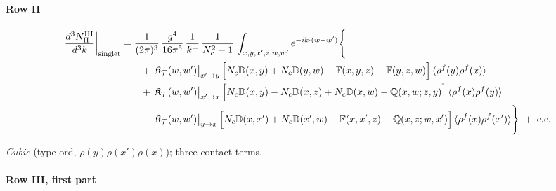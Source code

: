 \documentclass[10pt]{article}
\def\mf#1{\mathbb{#1}}
\begin{document}
\paragraph*{Row II}

\begin{align}
\frac{d^{3}N^{\rm III}_{\rm II}}{d^{3}k}\bigg|_{\rm singlet}&=\frac{1}{(2\pi)^{3}}\,\frac{g^{4}}{16\pi^{5}}\,\frac{1}{k^{+}}\,\frac{1}{N_{c}^{2}-1}\,\int_{x,y,x',z,w,w'}e^{-ik\cdot(w-w')}\Bigg\{\notag\\
&\qquad +\,\mathfrak{K}_{\mathcal{T}}(w,w')\big|_{x'\to y}\,\Big[N_{c}\mf{D}(x,y)+N_{c}\mf{D}(y,w)-\mf{F}(x,y,z)-\mf{F}(y,z,w)\Big]\,\langle\rho^{f}(y)\rho^{f}(x)\rangle\notag\\
&\qquad +\,\mathfrak{K}_{\mathcal{T}}(w,w')\big|_{x'\to x}\,\Big[N_{c}\mf{D}(x,y)-N_{c}\mf{D}(x,z)+N_{c}\mf{D}(x,w)-\mf{Q}(x,w;z,y)\Big]\,\langle\rho^{f}(x)\rho^{f}(y)\rangle\notag\\
&\qquad -\,\mathfrak{K}_{\mathcal{T}}(w,w')\big|_{y\to x}\,\Big[N_{c}\mf{D}(x,x')+N_{c}\mf{D}(x',w)-\mf{F}(x,x',z)-\mf{Q}(x,z;w,x')\Big]\,\langle\rho^{f}(x)\rho^{f}(x')\rangle\Bigg\}\;+\;{\rm c.c.}\label{eq:s-III-II}
\end{align}

\emph{Cubic} (type ord, $\rho(y)\rho(x')\rho(x)$); three contact terms.
\paragraph*{Row III, first part}
\end{document}
